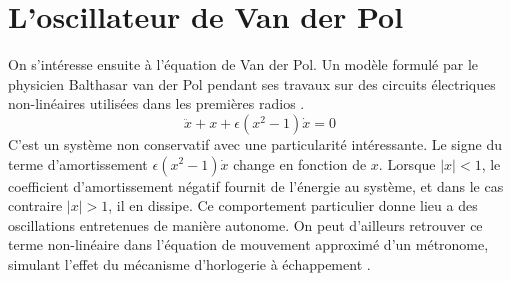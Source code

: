 \chapter{L'oscillateur de Van der Pol}
%
On s'intéresse ensuite à l'équation de Van der Pol. Un modèle formulé par le physicien Balthasar van der Pol
pendant ses travaux sur des circuits électriques non-linéaires utilisées dans les premières radios \cite{strogatz_nonlinear_2015}.
%
\begin{equation}
    \ddot{x} + x + \epsilon(x^2 - 1)\dot{x} = 0
    \label{eq:vdp}
\end{equation}
%
C'est un système non conservatif avec une particularité intéressante. 
Le signe du terme d'amortissement $\epsilon(x^2 - 1)\dot{x}$ change en fonction de $x$. 
Lorsque $|x|<1$, le coefficient d'amortissement négatif fournit de l'énergie au système, et dans le cas contraire $|x|>1$, il en dissipe. 
Ce comportement particulier donne lieu a des oscillations entretenues de manière autonome.
On peut d'ailleurs retrouver ce terme non-linéaire dans l'équation de mouvement approximé d'un métronome, 
simulant l'effet du mécanisme d'horlogerie à échappement \cite{wang_-phase_2018}.

